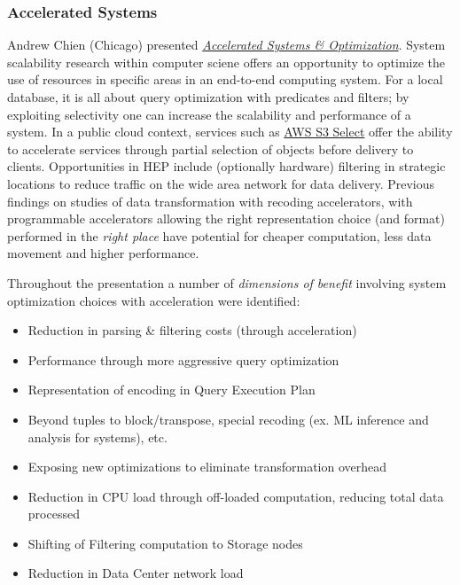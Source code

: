 \documentclass[11pt,letterpaper,fleqn]{article}
\begin{document}
\subsubsection{Accelerated Systems}
\vspace{0.2cm}
Andrew Chien (Chicago) presented \href{https://indico.cern.ch/event/820946/contributions/3464565/attachments/1867166/3070786/IRIS-HEP-Accelerated-Scalability-6-21-2019-v2.pdf}{\textit{Accelerated Systems \& Optimization}}.  System scalability research within computer sciene offers an opportunity to optimize the use of resources in specific areas in an end-to-end computing system. For a local database, it is all about query optimization with predicates and filters; by exploiting selectivity one can increase the scalability and performance of a system. In a public cloud context, services such as \href{https://aws.amazon.com/blogs/aws/s3-glacier-select/}{AWS S3 Select} offer the ability to accelerate services through partial selection of objects before delivery to clients. Opportunities in HEP include (optionally hardware) filtering in strategic locations to reduce traffic on the wide area network for data delivery. Previous findings on studies of data transformation with recoding accelerators, with programmable accelerators allowing the right representation choice (and format) performed in the {\it right place} have potential for cheaper computation, less data movement and higher performance.

Throughout the presentation a number of \textit{dimensions of benefit} involving system optimization choices with acceleration were identified:
\begin{itemize}
  \item Reduction in parsing \& filtering costs (through acceleration)
  \item Performance through more aggressive query optimization
  \item Representation of encoding in Query Execution Plan
  \item Beyond tuples to block/transpose, special recoding (ex. ML inference and analysis for systems), etc.
  \item Exposing new optimizations to eliminate transformation overhead
  \item Reduction in CPU load through off-loaded computation, reducing total data processed
  \item Shifting of Filtering computation to Storage nodes
  \item Reduction in Data Center network load
\end{itemize}
\end{document}
